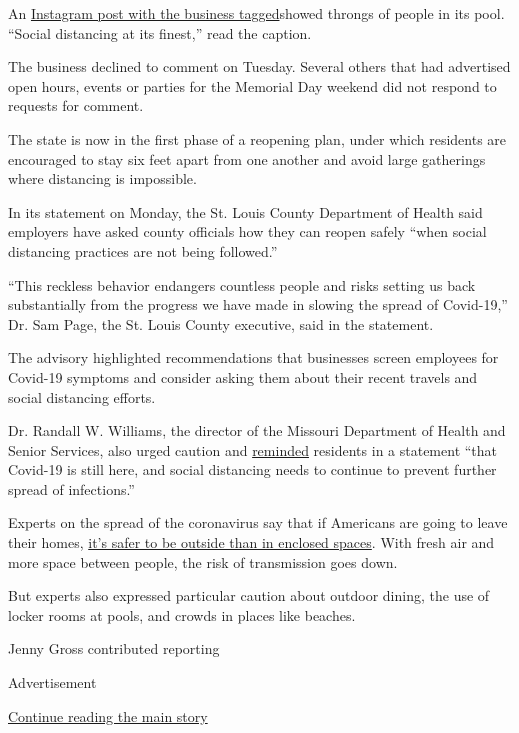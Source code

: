 An \href{https://www.instagram.com/p/CAig9WoJ48p/}{Instagram post with
the business tagged}showed throngs of people in its pool. ``Social
distancing at its finest,'' read the caption.

The business declined to comment on Tuesday. Several others that had
advertised open hours, events or parties for the Memorial Day weekend
did not respond to requests for comment.

The state is now in the first phase of a reopening plan, under which
residents are encouraged to stay six feet apart from one another and
avoid large gatherings where distancing is impossible.

In its statement on Monday, the St. Louis County Department of Health
said employers have asked county officials how they can reopen safely
``when social distancing practices are not being followed.''

``This reckless behavior endangers countless people and risks setting us
back substantially from the progress we have made in slowing the spread
of Covid-19,'' Dr. Sam Page, the St. Louis County executive, said in the
statement.

The advisory highlighted recommendations that businesses screen
employees for Covid-19 symptoms and consider asking them about their
recent travels and social distancing efforts.

Dr. Randall W. Williams, the director of the Missouri Department of
Health and Senior Services, also urged caution and
\href{https://health.mo.gov/news/newsitem/uuid/5e54a9ed-d816-466f-b19f-780edd138b23/statement-from-dr-randall-williams-director-of-missouri-department-of-health-and-senior-services}{reminded}
residents in a statement ``that Covid-19 is still here, and social
distancing needs to continue to prevent further spread of infections.''

Experts on the spread of the coronavirus say that if Americans are going
to leave their homes,
\href{https://www.nytimes3xbfgragh.onion/2020/05/15/us/coronavirus-what-to-do-outside.html}{it's
safer to be outside than in enclosed spaces}. With fresh air and more
space between people, the risk of transmission goes down.

But experts also expressed particular caution about outdoor dining, the
use of locker rooms at pools, and crowds in places like beaches.

Jenny Gross contributed reporting

Advertisement

\protect\hyperlink{after-bottom}{Continue reading the main story}

